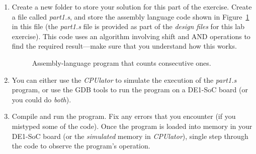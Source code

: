 \documentclass[epsfig,10pt,fullpage]{article}
\begin{document}
\begin{enumerate}
\item Create a new folder to store your solution for this part of the exercise. Create a
file called {\it part1.s}, and store the assembly language code shown in Figure~\ref{fig:code}
in this file (the {\it part1.s} file is provided as part of the {\it design files} for this 
lab exercise). This code uses an algorithm involving shift and 
AND operations to find the required result---make sure that you understand how this works.

\begin{figure}[H]
\begin{center}

\end{center}
\caption{Assembly-language program that counts consecutive ones.}
\label{fig:code}
\end{figure}

\newpage
\item
You can either use the {\it CPUlator} to simulate the execution of the {\it part1.s} program, or
use the GDB tools to run the program on a DE1-SoC board (or you could do {\it both}). 

\item
Compile and run the program. Fix any errors that you encounter (if you mistyped some of
the code). Once the program is loaded into memory in your DE1-SoC board (or the {\it simulated}
memory in {\it CPUlator}), single step through the code to observe the program's operation.
\end{enumerate}
\end{document}
